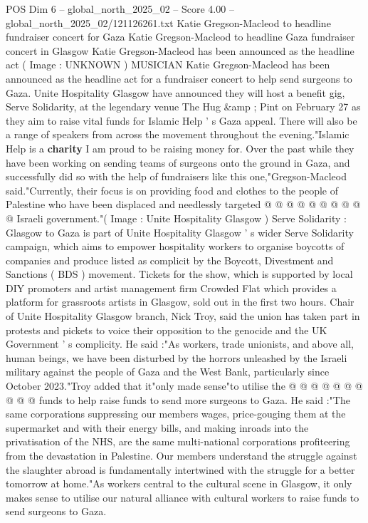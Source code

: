 \begin{textsample}{POS Dim 6 – global\_north\_2025\_02 – Score 4.00 – global\_north\_2025\_02/121126261.txt}  \label{ex:f6_pos_370}
Katie Gregson-Macleod to headline fundraiser concert for Gaza Katie Gregson-Macleod to headline Gaza fundraiser concert in Glasgow Katie Gregson-Macleod has been announced as the headline act ( Image : UNKNOWN ) MUSICIAN Katie Gregson-Macleod has been announced as the headline act for a fundraiser concert to help send surgeons to Gaza.
Unite Hospitality Glasgow have announced they will host a benefit gig, Serve Solidarity, at the legendary venue The Hug \&amp ; Pint on February 27 as they aim to raise vital funds for Islamic Help ' s Gaza appeal.
There will also be a range of speakers from across the movement throughout the evening."Islamic Help is a \textbf{charity} I am proud to be raising money for.
Over the past while they have been working on sending teams of surgeons onto the ground in Gaza, and successfully did so with the help of fundraisers like this one,"Gregson-Macleod said."Currently, their focus is on providing food and clothes to the people of Palestine who have been displaced and needlessly targeted @ @ @ @ @ @ @ @ @ @ Israeli government."( Image : Unite Hospitality Glasgow ) Serve Solidarity : Glasgow to Gaza is part of Unite Hospitality Glasgow ' s wider Serve Solidarity campaign, which aims to empower hospitality workers to organise boycotts of companies and produce listed as complicit by the Boycott, Divestment and Sanctions ( BDS ) movement.
Tickets for the show, which is supported by local DIY promoters and artist management firm Crowded Flat which provides a platform for grassroots artists in Glasgow, sold out in the first two hours.
Chair of Unite Hospitality Glasgow branch, Nick Troy, said the union has taken part in protests and pickets to voice their opposition to the genocide and the UK Government ' s complicity.
He said :"As workers, trade unionists, and above all, human beings, we have been disturbed by the horrors unleashed by the Israeli military against the people of Gaza and the West Bank, particularly since October 2023."Troy added that it"only made sense"to utilise the @ @ @ @ @ @ @ @ @ @ funds to help raise funds to send more surgeons to Gaza.
He said :"The same corporations suppressing our members wages, price-gouging them at the supermarket and with their energy bills, and making inroads into the privatisation of the NHS, are the same multi-national corporations profiteering from the devastation in Palestine.
Our members understand the struggle against the slaughter abroad is fundamentally intertwined with the struggle for a better tomorrow at home."As workers central to the cultural scene in Glasgow, it only makes sense to utilise our natural alliance with cultural workers to raise funds to send surgeons to Gaza.

\end{textsample}
